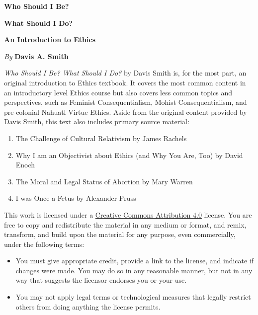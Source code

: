 \thispagestyle{empty}

\pagestyle{empty}

\vspace*{80pt}

\begin{raggedleft}
\fontsize{30pt}{24pt}\sffamily
\selectfont
  \textbf{Who Should I Be?}
  
  \textbf{What Should I Do?}

\medskip\fontsize{18pt}{20pt}\selectfont

\textbf{An Introduction to Ethics}

\vfill
\fontsize{12pt}{16pt}\selectfont \textit{By }  \textbf{Davis A. Smith}\\
\end{raggedleft}

\newpage

\noindent\fontsize{12pt}{16pt}\selectfont
\emph{Who Should I Be? What Should I Do?} by Davis Smith is, for the most part, an original introduction to Ethics textbook. It covers the most common content in an introductory level Ethics course but also covers less common topics and perspectives, such as Feminist Consequentialism, Mohist Consequentialism, and pre-colonial Nahuatl Virtue Ethics. Aside from the original content provided by Davis Smith, this text also includes primary source material:

\begin{enumerate}
\item The Challenge of Cultural Relativism by James Rachels
\item Why I am an Objectivist about Ethics (and Why You Are, Too) by David Enoch
\item The Moral and Legal Status of Abortion by Mary Warren
\item I was Once a Fetus by Alexander Pruss
\end{enumerate}


This work is licensed under a \href{https://creativecommons.org/licenses/by/4.0/}{Creative Commons Attribution 4.0} license.
You are free to copy and redistribute the material in any medium or format, and  remix, transform, and build upon the material for any purpose, even commercially, under the following terms:
\begin{itemize}
\item You must give appropriate credit, provide a link to the license, and indicate if changes were made. You may do so in any reasonable manner, but not in any way that suggests the licensor endorses you or your use.
\item You may not apply legal terms or technological measures that legally restrict others from doing anything the license permits.
\end{itemize}


\bigskip
